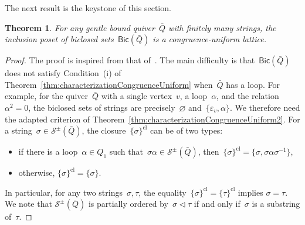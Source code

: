 \documentclass{amsart}
\newtheorem{theorem}{Theorem}[part]
\theoremstyle{definition}
\newcommand{\strings}{\mathcal{S}} %
\newcommand{\closure}[1]{#1^{\mathrm{cl}}} %
\newcommand{\Bicl}[1]{\mathsf{Bic}(#1)} %
\begin{document}
The next result is the keystone of this section.

\begin{theorem}
For any gentle bound quiver~$\bar Q$ with finitely many strings, the inclusion poset of biclosed sets~$\Bicl{\bar Q}$ is a congruence-uniform lattice.
\end{theorem}

\begin{proof}
The proof is inspired from that of~\cite[Thm.~6.5]{McConville}.
The main difficulty is that~$\Bicl{\bar Q}$ does not satisfy Condition~(i) of Theorem~\ref{thm:characterizationCongruenceUniform} when~$\bar Q$ has a loop.
For example, for the quiver~$\bar Q$ with a single vertex~$v$, a loop~$\alpha$, and the relation~$\alpha^2 = 0$, the biclosed sets of strings are precisely~$\varnothing$ and~$\{\varepsilon_v, \alpha\}$.
We therefore need the adapted criterion of Theorem~\ref{thm:characterizationCongruenceUniform2}.
For a string~$\sigma \in \strings^\pm(\bar Q)$, the closure~$\closure{\{\sigma\}}$ can be of two types:
\begin{itemize}
\item if there is a loop~$\alpha \in Q_1$ such that~$\sigma \alpha \in \strings^\pm(\bar Q)$, then~$\closure{\{\sigma\}} = \{\sigma, \sigma \alpha \sigma^{-1}\}$,
\item otherwise, $\closure{\{\sigma\}} = \{\sigma\}$.
\end{itemize}
In particular, for any two strings~$\sigma, \tau$, the equality~$\closure{\{\sigma\}}=\closure{\{\tau\}}$ implies $\sigma=\tau$.
We note that $\strings^\pm(\bar Q)$ is partially ordered by~$\sigma \vartriangleleft \tau$ if and only if~$\sigma$ is a substring of~$\tau$.


\end{proof}
\end{document}
